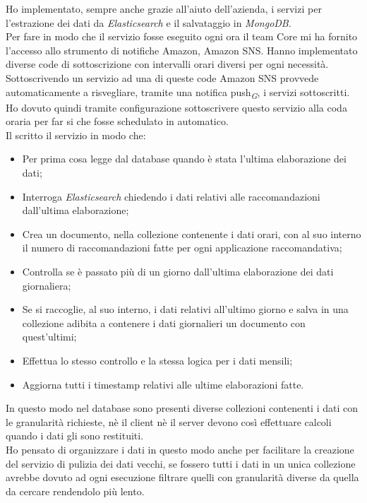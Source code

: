 \documentclass[a4paper, 12pt, twoside, openright]{book}
\newcommand{\gloss}[1]{#1\textsubscript{\textit{\tiny{G}}}}
\begin{document}
Ho implementato, sempre anche grazie all'aiuto dell'azienda, i servizi per l'estrazione dei dati da \textit{Elasticsearch} e il salvataggio in \textit{MongoDB}.\\
Per fare in modo che il servizio fosse eseguito ogni ora il team Core mi ha fornito l'accesso allo strumento di notifiche Amazon, Amazon SNS. Hanno implementato diverse code di sottoscrizione con intervalli orari diversi per ogni necessità. Sottoscrivendo un servizio ad una di queste code Amazon SNS provvede automaticamente a risvegliare, tramite una \gloss{notifica push}, i servizi sottoscritti.\\
Ho dovuto quindi tramite configurazione sottoscrivere questo servizio alla coda oraria per far si che fosse schedulato in automatico.\\
Il scritto il servizio in modo che:
\begin{itemize}
	\item Per prima cosa legge dal database quando è stata l'ultima elaborazione dei dati;
	\item Interroga \textit{Elasticsearch} chiedendo i dati relativi alle raccomandazioni dall'ultima elaborazione;
	\item Crea un documento, nella collezione contenente i dati orari, con al suo interno il numero di raccomandazioni fatte per ogni applicazione raccomandativa;
	\item Controlla se è passato più di un giorno dall'ultima elaborazione dei dati giornaliera;
	\item Se si raccoglie, al suo interno, i dati relativi all'ultimo giorno e salva in una collezione adibita a contenere i dati giornalieri un documento con quest'ultimi;
	\item Effettua lo stesso controllo e la stessa logica per i dati mensili;
	\item Aggiorna tutti i timestamp relativi alle ultime elaborazioni fatte.
\end{itemize}
In questo modo nel database sono presenti diverse collezioni contenenti i dati con le granularità richieste, nè il client nè il server devono così effettuare calcoli quando i dati gli sono restituiti.\\
Ho pensato di organizzare i dati in questo modo anche per facilitare la creazione del servizio di pulizia dei dati vecchi, se fossero tutti i dati in un unica collezione avrebbe dovuto ad ogni esecuzione filtrare quelli con granularità diverse da quella da cercare rendendolo più lento.\\
\end{document}

